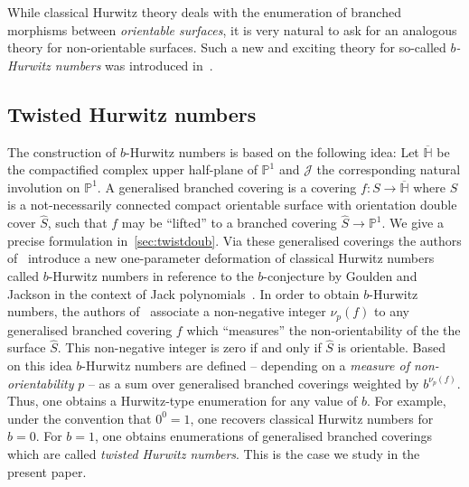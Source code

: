 While classical Hurwitz theory deals with the enumeration of branched morphisms between \textit{orientable surfaces}, it is very natural to ask for an analogous theory for non-orientable surfaces. Such a new and exciting theory for so-called \textit{$b$-Hurwitz numbers} was introduced in~\cite{chapuy2020non}.

\subsection{Twisted Hurwitz numbers}\label{sec-twistedsingle}
The construction of $b$-Hurwitz numbers is based on the following idea:  Let $\overline{\mathbb{H}}$ be the compactified complex upper half-plane of $\mathbb{P}^1$ and $\mathcal{J}$ the corresponding natural involution on $\mathbb{P}^1$. A generalised branched covering is a covering $f\colon S\to\overline{\mathbb{H}}$ where $S$ is a not-necessarily connected compact orientable surface with orientation double cover $\hat{S}$, such that $f$ may be ``lifted'' to a branched covering $\hat{S}\to\mathbb{P}^1$. We give a precise formulation in~\cref{sec:twistdoub}. Via these generalised coverings the authors of~\cite{chapuy2020non} introduce a new one-parameter deformation of classical Hurwitz numbers called $b$-Hurwitz numbers in reference to the $b$-conjecture by Goulden and Jackson in the context of Jack polynomials~\cite{goulden1996connection}. In order to obtain $b$-Hurwitz numbers, the authors of~\cite{chapuy2020non} associate a non-negative integer $\nu_p(f)$ to any generalised branched covering $f$ which ``measures'' the non-orientability of the the surface $\hat{S}$. This non-negative integer is zero if and only if $\hat{S}$ is orientable. Based on this idea $b$-Hurwitz numbers are defined -- depending on a \textit{measure of non-orientability} $p$ -- as a sum over generalised branched coverings weighted by $b^{\nu_p(f)}$. Thus, one obtains a Hurwitz-type enumeration for any value of $b$. For example, under the convention that $0^0=1$, one  recovers classical Hurwitz numbers for $b=0$. For $b=1$, one obtains enumerations of generalised branched coverings which are called \textit{twisted Hurwitz numbers}. This is the case we study in the present paper.

